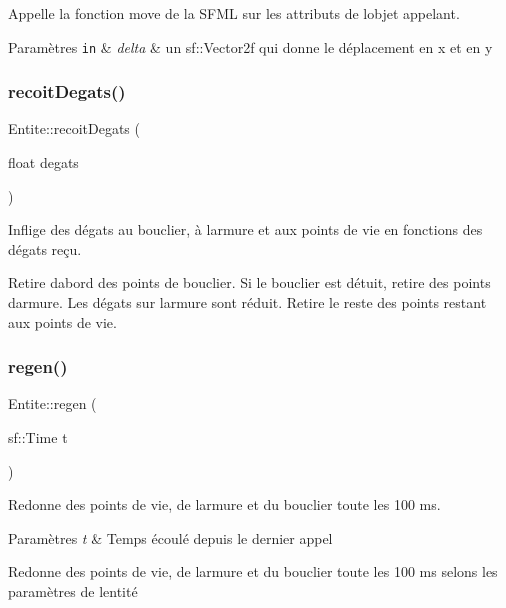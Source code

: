 Appelle la fonction move de la S\+F\+ML sur les attributs de l\textquotesingle{}objet appelant. 
\begin{DoxyParams}[1]{Paramètres}
\mbox{\tt in}  & {\em delta} & un {\ttfamily sf\+::\+Vector2f} qui donne le déplacement en x et en y \\
\hline
\end{DoxyParams}
\mbox{\label{class_entite_ab16c58f618b3b854310f92f044cc4a17}} 
\subsubsection{\texorpdfstring{recoit\+Degats()}{recoitDegats()}}
{\footnotesize\ttfamily Entite\+::recoit\+Degats (\begin{DoxyParamCaption}\item[{float}]{degats }\end{DoxyParamCaption})}



Inflige des dégats au bouclier, à l\textquotesingle{}armure et aux points de vie en fonctions des dégats reçu. 

Retire d\textquotesingle{}abord des points de bouclier. Si le bouclier est détuit, retire des points d\textquotesingle{}armure. Les dégats sur l\textquotesingle{}armure sont réduit. Retire le reste des points restant aux points de vie. \mbox{\label{class_entite_ac45ceffbeb11cbae7dca26fde5865b85}} 
\subsubsection{\texorpdfstring{regen()}{regen()}}
{\footnotesize\ttfamily Entite\+::regen (\begin{DoxyParamCaption}\item[{sf\+::\+Time}]{t }\end{DoxyParamCaption})}



Redonne des points de vie, de l\textquotesingle{}armure et du bouclier toute les 100 ms. 


\begin{DoxyParams}{Paramètres}
{\em t} & Temps écoulé depuis le dernier appel\\
\hline
\end{DoxyParams}
Redonne des points de vie, de l\textquotesingle{}armure et du bouclier toute les 100 ms selons les paramètres de l\textquotesingle{}entité \mbox{\label{class_entite_af1249039d313e4e691a109440663eae7}} 
